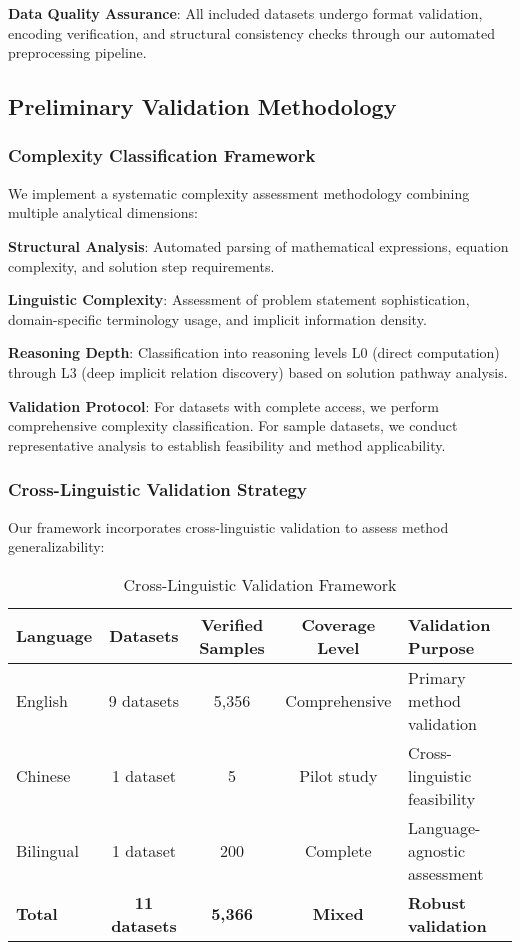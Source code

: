 \textbf{Data Quality Assurance}: All included datasets undergo format validation, encoding verification, and structural consistency checks through our automated preprocessing pipeline.

\subsection{Preliminary Validation Methodology}

\subsubsection{Complexity Classification Framework}

We implement a systematic complexity assessment methodology combining multiple analytical dimensions:

\textbf{Structural Analysis}: Automated parsing of mathematical expressions, equation complexity, and solution step requirements.

\textbf{Linguistic Complexity}: Assessment of problem statement sophistication, domain-specific terminology usage, and implicit information density.

\textbf{Reasoning Depth}: Classification into reasoning levels L0 (direct computation) through L3 (deep implicit relation discovery) based on solution pathway analysis.

\textbf{Validation Protocol}: For datasets with complete access, we perform comprehensive complexity classification. For sample datasets, we conduct representative analysis to establish feasibility and method applicability.

\subsubsection{Cross-Linguistic Validation Strategy}

Our framework incorporates cross-linguistic validation to assess method generalizability:

\begin{table}[htbp]
\caption{Cross-Linguistic Validation Framework}
\label{tab:linguistic_validation}
\centering
\small
\begin{tabular}{lcccl}
\toprule
\textbf{Language} & \textbf{Datasets} & \textbf{Verified Samples} & \textbf{Coverage Level} & \textbf{Validation Purpose} \\
\midrule
English & 9 datasets & 5,356 & Comprehensive & Primary method validation \\
Chinese & 1 dataset & 5 & Pilot study & Cross-linguistic feasibility \\
Bilingual & 1 dataset & 200 & Complete & Language-agnostic assessment \\
\midrule
\textbf{Total} & \textbf{11 datasets} & \textbf{5,366} & \textbf{Mixed} & \textbf{Robust validation} \\
\bottomrule
\end{tabular}
\end{table}

